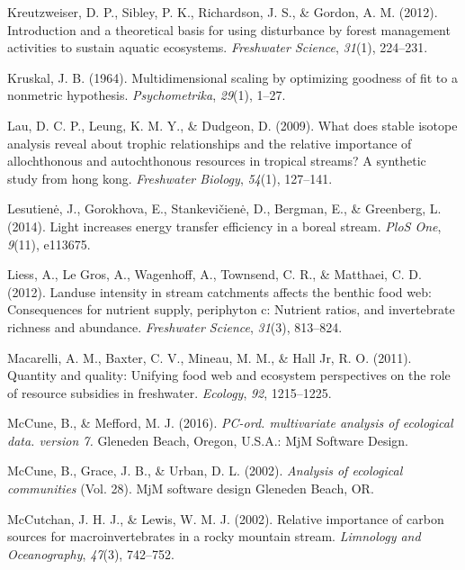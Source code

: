 \documentclass[double,12pt]{beavtex}
\begin{document}
  \hypertarget{ref-Kreutzweiser2012}{}
  Kreutzweiser, D. P., Sibley, P. K., Richardson, J. S., \& Gordon, A. M.
  (2012). Introduction and a theoretical basis for using disturbance by
  forest management activities to sustain aquatic ecosystems.
  \emph{Freshwater Science}, \emph{31}(1), 224--231.
  
  \hypertarget{ref-Kruskal1964}{}
  Kruskal, J. B. (1964). Multidimensional scaling by optimizing goodness
  of fit to a nonmetric hypothesis. \emph{Psychometrika}, \emph{29}(1),
  1--27.
  
  \hypertarget{ref-Lau2009}{}
  Lau, D. C. P., Leung, K. M. Y., \& Dudgeon, D. (2009). What does stable
  isotope analysis reveal about trophic relationships and the relative
  importance of allochthonous and autochthonous resources in tropical
  streams? A synthetic study from hong kong. \emph{Freshwater Biology},
  \emph{54}(1), 127--141.
  
  \hypertarget{ref-Lesutiene2014}{}
  Lesutienė, J., Gorokhova, E., Stankevičienė, D., Bergman, E., \&
  Greenberg, L. (2014). Light increases energy transfer efficiency in a
  boreal stream. \emph{PloS One}, \emph{9}(11), e113675.
  
  \hypertarget{ref-liess2012}{}
  Liess, A., Le Gros, A., Wagenhoff, A., Townsend, C. R., \& Matthaei, C.
  D. (2012). Landuse intensity in stream catchments affects the benthic
  food web: Consequences for nutrient supply, periphyton c: Nutrient
  ratios, and invertebrate richness and abundance. \emph{Freshwater
  Science}, \emph{31}(3), 813--824.
  
  \hypertarget{ref-Macarelli2011}{}
  Macarelli, A. M., Baxter, C. V., Mineau, M. M., \& Hall Jr, R. O.
  (2011). Quantity and quality: Unifying food web and ecosystem
  perspectives on the role of resource subsidies in freshwater.
  \emph{Ecology}, \emph{92}, 1215--1225.
  
  \hypertarget{ref-PC-ORD}{}
  McCune, B., \& Mefford, M. J. (2016). \emph{PC-ord. multivariate
  analysis of ecological data. version 7.} Gleneden Beach, Oregon, U.S.A.:
  MjM Software Design.
  
  \hypertarget{ref-McCune2002}{}
  McCune, B., Grace, J. B., \& Urban, D. L. (2002). \emph{Analysis of
  ecological communities} (Vol. 28). MjM software design Gleneden Beach,
  OR.
  
  \hypertarget{ref-McCutchan2002}{}
  McCutchan, J. H. J., \& Lewis, W. M. J. (2002). Relative importance of
  carbon sources for macroinvertebrates in a rocky mountain stream.
  \emph{Limnology and Oceanography}, \emph{47}(3), 742--752.
  
\end{document}
